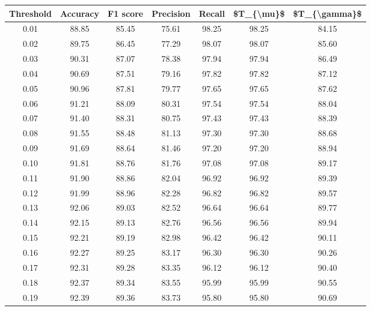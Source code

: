 \begin{tabular}{|c|c|c|c|c|c|c|}
\hline
 Threshold &  Accuracy &  F1 score &  Precision &  Recall &  \$T\_\{\textbackslash mu\}\$ &  \$T\_\{\textbackslash gamma\}\$ \\
\hline
      0.01 &     88.85 &     85.45 &      75.61 &   98.25 &      98.25 &         84.15 \\
      0.02 &     89.75 &     86.45 &      77.29 &   98.07 &      98.07 &         85.60 \\
      0.03 &     90.31 &     87.07 &      78.38 &   97.94 &      97.94 &         86.49 \\
      0.04 &     90.69 &     87.51 &      79.16 &   97.82 &      97.82 &         87.12 \\
      0.05 &     90.96 &     87.81 &      79.77 &   97.65 &      97.65 &         87.62 \\
      0.06 &     91.21 &     88.09 &      80.31 &   97.54 &      97.54 &         88.04 \\
      0.07 &     91.40 &     88.31 &      80.75 &   97.43 &      97.43 &         88.39 \\
      0.08 &     91.55 &     88.48 &      81.13 &   97.30 &      97.30 &         88.68 \\
      0.09 &     91.69 &     88.64 &      81.46 &   97.20 &      97.20 &         88.94 \\
      0.10 &     91.81 &     88.76 &      81.76 &   97.08 &      97.08 &         89.17 \\
      0.11 &     91.90 &     88.86 &      82.04 &   96.92 &      96.92 &         89.39 \\
      0.12 &     91.99 &     88.96 &      82.28 &   96.82 &      96.82 &         89.57 \\
      0.13 &     92.06 &     89.03 &      82.52 &   96.64 &      96.64 &         89.77 \\
      0.14 &     92.15 &     89.13 &      82.76 &   96.56 &      96.56 &         89.94 \\
      0.15 &     92.21 &     89.19 &      82.98 &   96.42 &      96.42 &         90.11 \\
      0.16 &     92.27 &     89.25 &      83.17 &   96.30 &      96.30 &         90.26 \\
      0.17 &     92.31 &     89.28 &      83.35 &   96.12 &      96.12 &         90.40 \\
      0.18 &     92.37 &     89.34 &      83.55 &   95.99 &      95.99 &         90.55 \\
      0.19 &     92.39 &     89.36 &      83.73 &   95.80 &      95.80 &         90.69 \\

\end{tabular}
